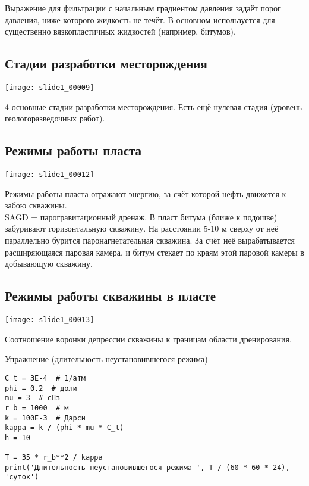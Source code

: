 \documentclass[main.tex]{subfiles}
\begin{document}
Выражение для фильтрации с начальным градиентом давления задаёт порог давления, ниже которого жидкость не течёт. В основном используется для существенно вязкопластичных жидкостей (например, битумов).

\subsection{Стадии разработки месторождения}
\texttt{[image: slide1\_00009]}

4 основные стадии разработки месторождения. Есть ещё нулевая стадия (уровень геологоразведочных работ).



\subsection{Режимы работы пласта}
\texttt{[image: slide1\_00012]}

Режимы работы пласта отражают энергию, за счёт которой нефть движется к забою скважины.\\

SAGD = парогравитационный дренаж. В пласт битума (ближе к подошве) забуривают горизонтальную скважину. На расстоянии 5-10 м сверху от неё параллельно бурится паронагнетательная скважина. За счёт неё вырабатывается расширяющаяся паровая камера, и битум стекает по краям этой паровой камеры в добывающую скважину.


\subsection{Режимы работы скважины в пласте}
\texttt{[image: slide1\_00013]}





Соотношение воронки депрессии скважины к границам области дренирования.

Упражнение (длительность неустановившегося режима)

\begin{listing}[h]
\begin{verbatim}
C_t = 3E-4  # 1/атм
phi = 0.2  # доли
mu = 3  # сПз
r_b = 1000  # м
k = 100E-3  # Дарси
kappa = k / (phi * mu * C_t)
h = 10

T = 35 * r_b**2 / kappa
print('Длительность неустановившегося режима ', T / (60 * 60 * 24), 'суток')
\end{verbatim}
\end{listing}
\end{document}
